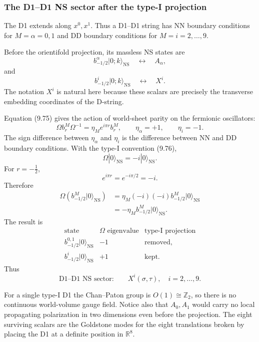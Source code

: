 \documentclass[
  10pt,
  a4paper,
  openany]{book}
\begin{document}
\subsubsection{The D1--D1 NS sector after the type-I
projection}\label{the-d1d1-ns-sector-after-the-type-i-projection}

The D1 extends along \(x^0,x^1\). Thus a D1--D1 string has NN boundary
conditions for \(M=\alpha=0,1\) and DD boundary conditions for
\(M=i=2,\ldots,9\).

Before the orientifold projection, its massless NS states are \[
b_{-1/2}^\alpha|0;k\rangle_{\mathrm{NS}}
\quad\longleftrightarrow\quad
A_\alpha,
\] and \[
b_{-1/2}^i|0;k\rangle_{\mathrm{NS}}
\quad\longleftrightarrow\quad
X^i.
\] The notation \(X^i\) is natural here because these scalars are
precisely the transverse embedding coordinates of the D-string.

Equation (9.75) gives the action of world-sheet parity on the fermionic
oscillators: \[
\Omega b_r^M\Omega^{-1}
=\eta_M e^{i\pi r}b_r^M,
\qquad
\eta_\alpha=+1,
\qquad
\eta_i=-1.
\] The sign difference between \(\eta_\alpha\) and \(\eta_i\) is the
difference between NN and DD boundary conditions. With the type-I
convention (9.76), \[
\Omega|0\rangle_{\mathrm{NS}}
=-i|0\rangle_{\mathrm{NS}}.
\] For \(r=-\frac12\), \[
e^{i\pi r}=e^{-i\pi/2}=-i.
\] Therefore \[
\begin{aligned}
\Omega\left(
b_{-1/2}^M|0\rangle_{\mathrm{NS}}
\right)
&=
\eta_M(-i)(-i)
b_{-1/2}^M|0\rangle_{\mathrm{NS}}\\
&=-\eta_M
b_{-1/2}^M|0\rangle_{\mathrm{NS}}.
\end{aligned}
\] The result is \[
\begin{array}{c|c|c}
\text{state}&\Omega\text{ eigenvalue}&\text{type-I projection}\\ \hline
b_{-1/2}^{0,1}|0\rangle_{\mathrm{NS}}
&-1
&\text{removed},\\
b_{-1/2}^{i}|0\rangle_{\mathrm{NS}}
&+1
&\text{kept}.
\end{array}
\] Thus \[
\boxed{
\text{D1--D1 NS sector:}\qquad
X^i(\sigma,\tau),
\quad i=2,\ldots,9
}.
\]

For a single type-I D1 the Chan--Paton group is
\(O(1)\cong\mathbb Z_2\), so there is no continuous world-volume gauge
field. Notice also that \(A_0,A_1\) would carry no local propagating
polarization in two dimensions even before the projection. The eight
surviving scalars are the Goldstone modes for the eight translations
broken by placing the D1 at a definite position in \(\mathbb R^8\).
\end{document}
